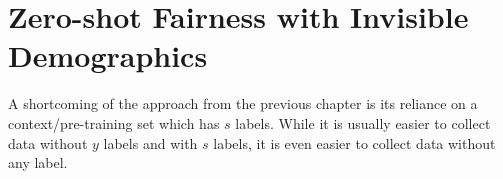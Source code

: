 \chapter{Zero-shot Fairness with Invisible Demographics}\label{ch:zsf}
A shortcoming of the approach from the previous chapter
is its reliance on a context/pre-training set which has \(s\) labels.
While it is usually easier to collect data without \(y\) labels and with \(s\) labels,
it is even easier to collect data without any label.
